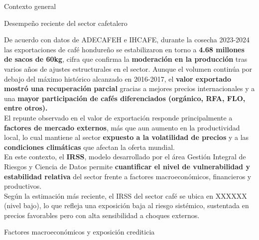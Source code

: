 \documentclass[final]{beamer}
\newlength{\colwidth}
\begin{document}
\begin{frame}[t]
\begin{columns}[t]
\begin{column}{\colwidth}
\begin{block}{Contexto general}
  \end{block}
  \begin{block}{Desempeño reciente del sector cafetalero}

De acuerdo con datos de ADECAFEH e IHCAFE, durante la cosecha 2023-2024 las exportaciones de café hondureño se estabilizaron en torno a \textbf{4.68 millones de sacos de 60kg}, cifra que confirma la \textbf{moderación en la producción} tras varios años de ajustes estructurales en el sector. Aunque el volumen continúa por debajo del máximo histórico alcanzado en 2016-2017, el \textbf{valor exportado mostró una recuperación parcial} gracias a mejores precios internacionales y a una \textbf{mayor participación de cafés diferenciados (orgánico, RFA, FLO, entre otros).}\\[1cm]

El repunte observado en el valor de exportación responde principalmente a \textbf{factores de mercado externos}, más que aun aumento en la productividad local, lo cual mantiene al sector \textbf{expuesto a la volatilidad de precios} y a las \textbf{condiciones climáticas} que afectan la oferta mundial. \\[1cm]

En este contexto, el \textbf{IRSS}, modelo desarrollado por el área Gestión Integral de Riesgos y Ciencia de Datos permite \textbf{cuantificar el nivel de vulnerabilidad y estabilidad relativa} del sector frente a factores macroeconómicos, financieros y productivos. \\[1cm]

Según la estimación más reciente, el IRSS del sector café se ubica en XXXXXX (nivel bajo), lo que refleja una exposición baja al riesgo sistémico, sustentada en precios favorables pero con alta sensibilidad a choques externos.

   

  \end{block}
  \begin{block}{Factores macroeconómicos y exposición crediticia}


\end{block}
\end{column}
\end{columns}
\end{frame}
\end{document}
